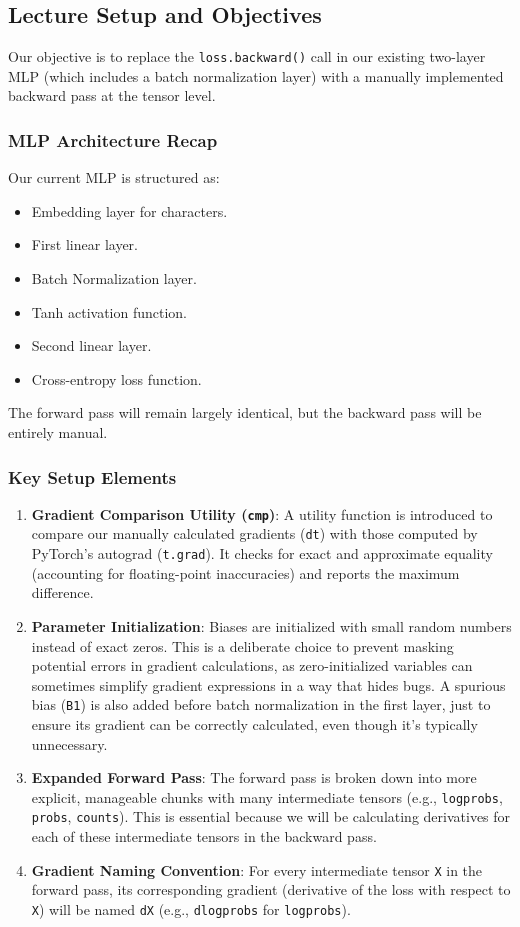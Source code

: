 \subsection{Lecture Setup and Objectives}

Our objective is to replace the \texttt{loss.backward()} call in our existing two-layer MLP (which includes a batch normalization layer) with a manually implemented backward pass at the tensor level.

\subsubsection{MLP Architecture Recap}
Our current MLP is structured as:
\begin{itemize}
    \item Embedding layer for characters.
    \item First linear layer.
    \item Batch Normalization layer.
    \item Tanh activation function.
    \item Second linear layer.
    \item Cross-entropy loss function.
\end{itemize}
The forward pass will remain largely identical, but the backward pass will be entirely manual.

\subsubsection{Key Setup Elements}
\begin{enumerate}
    \item \textbf{Gradient Comparison Utility (\texttt{cmp})}: A utility function is introduced to compare our manually calculated gradients (\texttt{dt}) with those computed by PyTorch's autograd (\texttt{t.grad}). It checks for exact and approximate equality (accounting for floating-point inaccuracies) and reports the maximum difference.
    \item \textbf{Parameter Initialization}: Biases are initialized with small random numbers instead of exact zeros. This is a deliberate choice to prevent masking potential errors in gradient calculations, as zero-initialized variables can sometimes simplify gradient expressions in a way that hides bugs. A spurious bias (\texttt{B1}) is also added before batch normalization in the first layer, just to ensure its gradient can be correctly calculated, even though it's typically unnecessary.
    \item \textbf{Expanded Forward Pass}: The forward pass is broken down into more explicit, manageable chunks with many intermediate tensors (e.g., \texttt{logprobs}, \texttt{probs}, \texttt{counts}). This is essential because we will be calculating derivatives for each of these intermediate tensors in the backward pass.
    \item \textbf{Gradient Naming Convention}: For every intermediate tensor \texttt{X} in the forward pass, its corresponding gradient (derivative of the loss with respect to \texttt{X}) will be named \texttt{dX} (e.g., \texttt{dlogprobs} for \texttt{logprobs}).
\end{enumerate}

